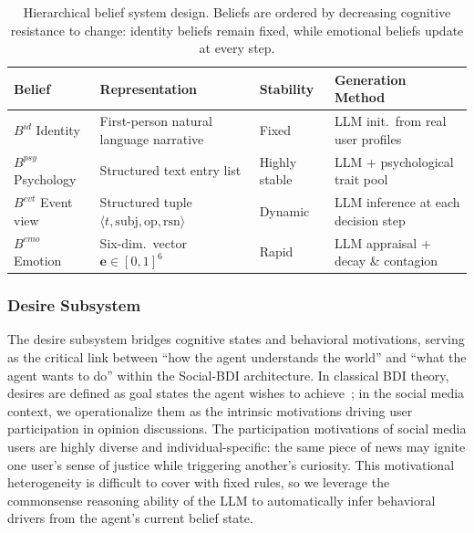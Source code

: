 \documentclass[a4paper,fleqn]{cas-dc}
\begin{document}
\begin{table}[!t]
\centering
\caption{Hierarchical belief system design. Beliefs are ordered by decreasing cognitive resistance to change: identity beliefs remain fixed, while emotional beliefs update at every step.}
\label{tab:belief}
\scriptsize
\renewcommand{\arraystretch}{1.15}
\begin{tabular}{@{}p{1.15cm}p{1.85cm}p{1.05cm}p{2.3cm}@{}}
\toprule
\textbf{Belief} & \textbf{Representation} & \textbf{Stability} & \textbf{Generation Method} \\
\midrule
$B^{id}$ \newline Identity & First-person natural language narrative & Fixed & LLM init.\ from real user profiles \\
\addlinespace
$B^{psy}$ \newline Psychology & Structured text entry list & Highly stable & LLM + psychological trait pool \\
\addlinespace
$B^{evt}$ \newline Event view & Structured tuple $\langle t, \text{subj}, \text{op}, \text{rsn}\rangle$ & Dynamic & LLM inference at each decision step \\
\addlinespace
$B^{emo}$ \newline Emotion & Six-dim.\ vector $\mathbf{e}\!\in\![0,1]^6$ & Rapid & LLM appraisal + decay \& contagion \\
\bottomrule
\end{tabular}
\end{table}

\subsubsection{Desire Subsystem}

The desire subsystem bridges cognitive states and behavioral motivations, serving as the critical link between ``how the agent understands the world'' and ``what the agent wants to do'' within the Social-BDI architecture. In classical BDI theory, desires are defined as goal states the agent wishes to achieve~\citep{bratman_intention_1987}; in the social media context, we operationalize them as the intrinsic motivations driving user participation in opinion discussions. The participation motivations of social media users are highly diverse and individual-specific: the same piece of news may ignite one user's sense of justice while triggering another's curiosity. This motivational heterogeneity is difficult to cover with fixed rules, so we leverage the commonsense reasoning ability of the LLM to automatically infer behavioral drivers from the agent's current belief state.
\end{document}
